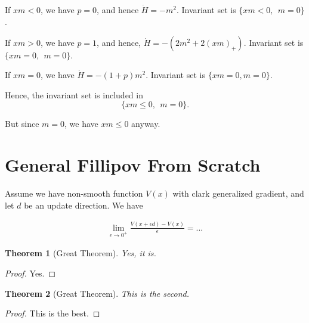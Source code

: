 \documentclass[11pt,letterpaper]{article}
\newtheorem{thm}{Theorem}[section]
\newtheorem{theorem}[thm]{Theorem}
\theoremstyle{definition}
\begin{document}
If $xm <0$, we have $p=0$, and hence $\dot H = - m^2$. 
Invariant set is $\{xm < 0, ~~ m=0\}$.

If $xm >0$, we have $p = 1$, and hence, $\dot H = -(2 m^2 + 2 (xm)_+)$. Invariant set is $\{xm=0, ~~ m=0\}.$

If $xm=0$, we have $\dot H = -(1+p) m^2$. Invariant set is $\{xm=0, m = 0\}$. 

Hence, the invariant set is included in 
$$
\{xm \leq 0, ~~ m = 0\}. 
$$

But since $m=0$, we have $xm\leq 0$ anyway. 


\section{General Fillipov From Scratch}

\begin{ctheorem}
Assume we have non-smooth function $V(x)$ with clark generalized gradient, and let $d$ be an update direction. We have 
\end{ctheorem} 
\begin{cproof} 
\begin{align*}
\lim_{\epsilon \to 0^+}\frac{V(x + \epsilon d) - V(x)}{\epsilon} 
= ... 
\end{align*}  
\end{cproof}   

\begin{thm}[Great Theorem]
    Yes, it is. 
\end{thm}
\begin{proof} 
    Yes. 
\end{proof}    

\begin{theorem}[Great Theorem]
    This is the second. 
\end{theorem}
\begin{proof}
    This is the best. 
\end{proof}     




 

\end{document}

